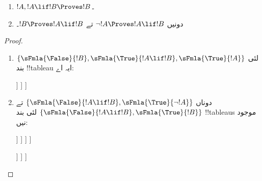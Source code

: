 \documentclass[../../../include/open-logic-section]{subfiles}
\begin{document}
\begin{prop}
  \begin{enumerate}
  \item {} $!A, !A \lif !B \Proves !B$۔
  \item {}
    دونیں $\lnot !A \Proves !A \lif !B$ تے $!B \Proves !A \lif !B$۔
  \end{enumerate}
\end{prop}

\begin{proof}
  \begin{enumerate}
    \item $\{\sFmla{\False}{!B}, \sFmla{\True}{!A \lif !B},
      \sFmla{\True}{!A}\}$ لئی بند !!{tableau} ایہ اے:
      \begin{oltableau}
        [\sFmla{\False}{\formula{B}}, just=\TAss
          [\sFmla{\True}{\formula{A} \lif \formula{B}}, just=\TAss
            [\sFmla{\True}{\formula{A}}, just=\TAss
              [\sFmla{\False}{\formula{A}}, just = {\TRule{\True}{\lif}[2]}, close]
              [\sFmla{\True}{\formula{B}}, just = {\TRule{\True}{\lif}[2]}, close]
            ]
          ]
        ]
      \end{oltableau}
    \item دوناں $\{\sFmla{\False}{!A \lif !B},
      \sFmla{\True}{\lnot !A}\}$ تے $\{\sFmla{\False}{!A \lif !B},
      \sFmla{\True}{!B}\}$ لئی بند !!{tableau}s موجود نیں:
      \begin{oltableau}
        [\sFmla{\False}{\formula{A} \lif \formula{B}}, just = \TAss
          [\sFmla{\True}{\lnot \formula{A}}, just = \TAss
            [\sFmla{\True}{\formula{A}}, just = {\TRule{\False}{\lif}[1]}
              [\sFmla{\False}{\formula{B}}, just = {\TRule{\False}{\lif}[1]}
                [\sFmla{\False}{\formula{A}}, just = {\TRule{\True}{\lnot}[2]}, close]
              ]
            ]
          ]
        ]
      \end{oltableau}
      \begin{oltableau}
        [\sFmla{\False}{\formula{A} \lif \formula{B}}, just = \TAss
          [\sFmla{\True}{\formula{B}}, just = \TAss
            [\sFmla{\True}{\formula{A}}, just = {\TRule{\False}{\lif}[1]}
              [\sFmla{\False}{\formula{B}}, just = {\TRule{\False}{\lif}[1]},close
              ]
            ]
          ]
        ]
      \end{oltableau}
  \end{enumerate}
\end{proof}
\end{document}
